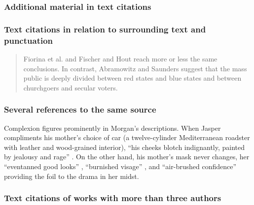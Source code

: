 \documentclass[11pt,letterpaper,oneside]{article}
\begin{document}
\setcounter{subsubsection}{23}
\subsubsection{Additional material in text citations}

\begin{citeref}
\item \parencite[; t-tests are used here]{mandolan2017}
\end{citeref}

\subsubsection{Text citations in relation to surrounding text and punctuation}
\label{15.25}

\begin{quote} Fiorina et al. \parencite*{fiorina2005} and Fischer and
Hout \parencite*{fischer2006} reach more or less the same conclusions.
In contrast, Abramowitz and Saunders \parencite*{abramowitz2005}
suggest that the mass public is deeply divided between red states and
blue states and between churchgoers and secular voters. \end{quote}

\setcounter{subsubsection}{26}
\subsubsection{Several references to the same source}

\begin{citeref}%
\item Complexion figures prominently in Morgan's descriptions. When
Jasper compliments his mother's choice of car (a twelve-cylinder
Mediterranean roadster with leather and wood-grained interior), ``his
cheeks blotch indignantly, painted by jealousy and rage''
\parencite[47]{chaston2000}. On the other hand, his mother's mask
never changes, her ``even\-tanned good looks''
\parencite[56]{chaston2000}, ``burnished visage''
\parencite[101]{chaston2000}, and ``air-brushed confidence''
\parencite[211]{chaston2000} providing the foil to the drama in her
midst. \end{citeref}

\setcounter{subsubsection}{28}
\subsubsection{Text citations of works with more than three authors}
\end{document}
